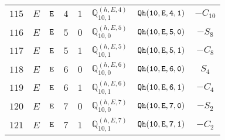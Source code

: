 \documentclass[fleqn,8pt]{jsarticle}
\begin{document}
\begin{table}[ht!]
\begin{center}
\begin{tabular}{cccccccc}
$ 115 $ & $ E $ & $ {\tt E} $ & $ 4 $ & $ 1 $ & $ \mathbb{Q}_{10,1}^{(h,E,4)} $ & $ {\tt Qh(10,E,4,1)} $ & $ - C_{10} $ \\
$ 116 $ & $ E $ & $ {\tt E} $ & $ 5 $ & $ 0 $ & $ \mathbb{Q}_{10,0}^{(h,E,5)} $ & $ {\tt Qh(10,E,5,0)} $ & $ - S_{8} $ \\
$ 117 $ & $ E $ & $ {\tt E} $ & $ 5 $ & $ 1 $ & $ \mathbb{Q}_{10,1}^{(h,E,5)} $ & $ {\tt Qh(10,E,5,1)} $ & $ - C_{8} $ \\
$ 118 $ & $ E $ & $ {\tt E} $ & $ 6 $ & $ 0 $ & $ \mathbb{Q}_{10,0}^{(h,E,6)} $ & $ {\tt Qh(10,E,6,0)} $ & $ S_{4} $ \\
$ 119 $ & $ E $ & $ {\tt E} $ & $ 6 $ & $ 1 $ & $ \mathbb{Q}_{10,1}^{(h,E,6)} $ & $ {\tt Qh(10,E,6,1)} $ & $ - C_{4} $ \\
$ 120 $ & $ E $ & $ {\tt E} $ & $ 7 $ & $ 0 $ & $ \mathbb{Q}_{10,0}^{(h,E,7)} $ & $ {\tt Qh(10,E,7,0)} $ & $ - S_{2} $ \\
$ 121 $ & $ E $ & $ {\tt E} $ & $ 7 $ & $ 1 $ & $ \mathbb{Q}_{10,1}^{(h,E,7)} $ & $ {\tt Qh(10,E,7,1)} $ & $ - C_{2} $ \\
 \hline \hline
\end{tabular}
\end{center}
\end{table}
\end{document}
